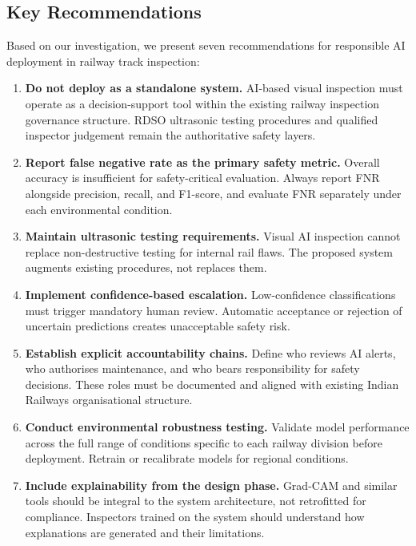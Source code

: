 \documentclass[conference]{IEEE}
\begin{document}
\subsection{Key Recommendations}

Based on our investigation, we present seven recommendations for responsible AI deployment in railway track inspection:

\begin{enumerate}
    \item \textbf{Do not deploy as a standalone system.} AI-based visual inspection must operate as a decision-support tool within the existing railway inspection governance structure. RDSO ultrasonic testing procedures and qualified inspector judgement remain the authoritative safety layers.
    \item \textbf{Report false negative rate as the primary safety metric.} Overall accuracy is insufficient for safety-critical evaluation. Always report FNR alongside precision, recall, and F1-score, and evaluate FNR separately under each environmental condition.
    \item \textbf{Maintain ultrasonic testing requirements.} Visual AI inspection cannot replace non-destructive testing for internal rail flaws. The proposed system augments existing procedures, not replaces them.
    \item \textbf{Implement confidence-based escalation.} Low-confidence classifications must trigger mandatory human review. Automatic acceptance or rejection of uncertain predictions creates unacceptable safety risk.
    \item \textbf{Establish explicit accountability chains.} Define who reviews AI alerts, who authorises maintenance, and who bears responsibility for safety decisions. These roles must be documented and aligned with existing Indian Railways organisational structure.
    \item \textbf{Conduct environmental robustness testing.} Validate model performance across the full range of conditions specific to each railway division before deployment. Retrain or recalibrate models for regional conditions.
    \item \textbf{Include explainability from the design phase.} Grad-CAM and similar tools should be integral to the system architecture, not retrofitted for compliance. Inspectors trained on the system should understand how explanations are generated and their limitations.
\end{enumerate}
\end{document}
